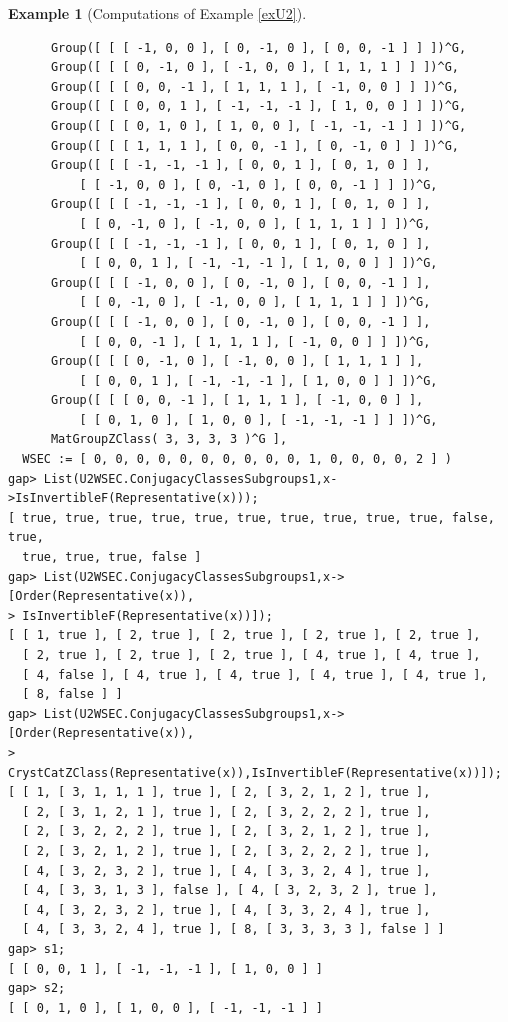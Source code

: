 \documentclass{amsart}
\theoremstyle{plain}
\theoremstyle{definition}
\newtheorem{example}[theorem]{Example}
\theoremstyle{remark}
\begin{document}
\begin{example}[{Computations of Example \ref{exU2}}]
\begin{verbatim}
      Group([ [ [ -1, 0, 0 ], [ 0, -1, 0 ], [ 0, 0, -1 ] ] ])^G, 
      Group([ [ [ 0, -1, 0 ], [ -1, 0, 0 ], [ 1, 1, 1 ] ] ])^G, 
      Group([ [ [ 0, 0, -1 ], [ 1, 1, 1 ], [ -1, 0, 0 ] ] ])^G, 
      Group([ [ [ 0, 0, 1 ], [ -1, -1, -1 ], [ 1, 0, 0 ] ] ])^G, 
      Group([ [ [ 0, 1, 0 ], [ 1, 0, 0 ], [ -1, -1, -1 ] ] ])^G, 
      Group([ [ [ 1, 1, 1 ], [ 0, 0, -1 ], [ 0, -1, 0 ] ] ])^G, 
      Group([ [ [ -1, -1, -1 ], [ 0, 0, 1 ], [ 0, 1, 0 ] ], 
          [ [ -1, 0, 0 ], [ 0, -1, 0 ], [ 0, 0, -1 ] ] ])^G, 
      Group([ [ [ -1, -1, -1 ], [ 0, 0, 1 ], [ 0, 1, 0 ] ], 
          [ [ 0, -1, 0 ], [ -1, 0, 0 ], [ 1, 1, 1 ] ] ])^G, 
      Group([ [ [ -1, -1, -1 ], [ 0, 0, 1 ], [ 0, 1, 0 ] ], 
          [ [ 0, 0, 1 ], [ -1, -1, -1 ], [ 1, 0, 0 ] ] ])^G, 
      Group([ [ [ -1, 0, 0 ], [ 0, -1, 0 ], [ 0, 0, -1 ] ], 
          [ [ 0, -1, 0 ], [ -1, 0, 0 ], [ 1, 1, 1 ] ] ])^G, 
      Group([ [ [ -1, 0, 0 ], [ 0, -1, 0 ], [ 0, 0, -1 ] ], 
          [ [ 0, 0, -1 ], [ 1, 1, 1 ], [ -1, 0, 0 ] ] ])^G, 
      Group([ [ [ 0, -1, 0 ], [ -1, 0, 0 ], [ 1, 1, 1 ] ], 
          [ [ 0, 0, 1 ], [ -1, -1, -1 ], [ 1, 0, 0 ] ] ])^G, 
      Group([ [ [ 0, 0, -1 ], [ 1, 1, 1 ], [ -1, 0, 0 ] ], 
          [ [ 0, 1, 0 ], [ 1, 0, 0 ], [ -1, -1, -1 ] ] ])^G, 
      MatGroupZClass( 3, 3, 3, 3 )^G ], 
  WSEC := [ 0, 0, 0, 0, 0, 0, 0, 0, 0, 0, 1, 0, 0, 0, 0, 2 ] )
gap> List(U2WSEC.ConjugacyClassesSubgroups1,x->IsInvertibleF(Representative(x)));
[ true, true, true, true, true, true, true, true, true, true, false, true, 
  true, true, true, false ]
gap> List(U2WSEC.ConjugacyClassesSubgroups1,x->[Order(Representative(x)),
> IsInvertibleF(Representative(x))]);
[ [ 1, true ], [ 2, true ], [ 2, true ], [ 2, true ], [ 2, true ], 
  [ 2, true ], [ 2, true ], [ 2, true ], [ 4, true ], [ 4, true ], 
  [ 4, false ], [ 4, true ], [ 4, true ], [ 4, true ], [ 4, true ], 
  [ 8, false ] ]
gap> List(U2WSEC.ConjugacyClassesSubgroups1,x->[Order(Representative(x)),
> CrystCatZClass(Representative(x)),IsInvertibleF(Representative(x))]);
[ [ 1, [ 3, 1, 1, 1 ], true ], [ 2, [ 3, 2, 1, 2 ], true ], 
  [ 2, [ 3, 1, 2, 1 ], true ], [ 2, [ 3, 2, 2, 2 ], true ], 
  [ 2, [ 3, 2, 2, 2 ], true ], [ 2, [ 3, 2, 1, 2 ], true ], 
  [ 2, [ 3, 2, 1, 2 ], true ], [ 2, [ 3, 2, 2, 2 ], true ], 
  [ 4, [ 3, 2, 3, 2 ], true ], [ 4, [ 3, 3, 2, 4 ], true ], 
  [ 4, [ 3, 3, 1, 3 ], false ], [ 4, [ 3, 2, 3, 2 ], true ], 
  [ 4, [ 3, 2, 3, 2 ], true ], [ 4, [ 3, 3, 2, 4 ], true ], 
  [ 4, [ 3, 3, 2, 4 ], true ], [ 8, [ 3, 3, 3, 3 ], false ] ]
gap> s1;
[ [ 0, 0, 1 ], [ -1, -1, -1 ], [ 1, 0, 0 ] ]
gap> s2;
[ [ 0, 1, 0 ], [ 1, 0, 0 ], [ -1, -1, -1 ] ]

\end{verbatim}
\end{example}
\end{document}

